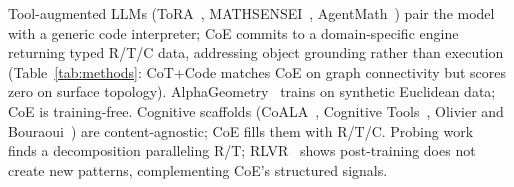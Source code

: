 Tool-augmented LLMs (ToRA~\citep{gou2024tora},
MATHSENSEI~\citep{das2024mathsensei},
AgentMath~\citep{luo2025agentmath}) pair the model with a generic code
interpreter; CoE commits to a domain-specific engine returning typed
R/T/C data, addressing object grounding rather than execution
(Table~\ref{tab:methods}: CoT+Code matches CoE on graph connectivity but
scores zero on surface topology).
AlphaGeometry~\citep{trinh2024alphageometry,trinh2025alphageometry2}
trains on synthetic Euclidean data; CoE is training-free.
Cognitive scaffolds (CoALA~\citep{sumers2023coala}, Cognitive
Tools~\citep{ebouky2025cogtools}, Olivier and
Bouraoui~\citep{olivier2025embodied}) are content-agnostic; CoE fills
them with R/T/C. Probing work~\citep{an2026humancog} finds a decomposition
paralleling R/T; RLVR~\citep{yang2025rlvr} shows post-training does not
create new patterns, complementing CoE's structured signals.
